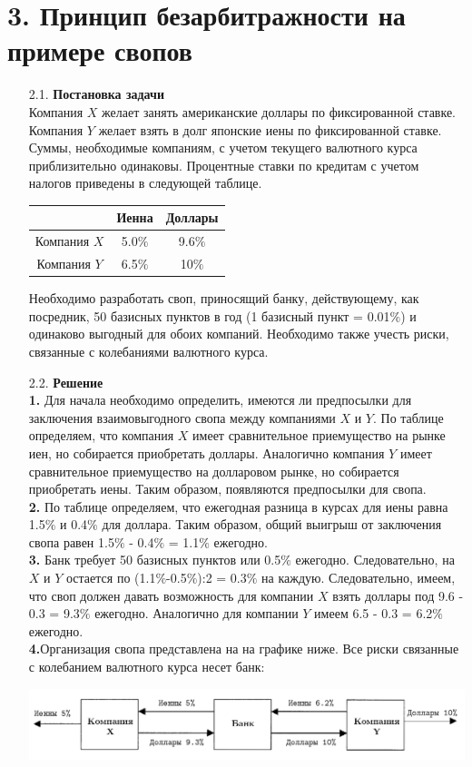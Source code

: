 \documentclass[12pt,a4 paper]{book}
\begin{document}
\section*{3. Принцип безарбитражности на примере свопов}
\smallskip
\begin{enumerate}
\item[2.1.] \textbf{Постановка задачи}
\\Компания $X$ желает занять американские доллары по фиксированной ставке. Компания $Y$ желает взять в долг японские иены по фиксированной ставке. Суммы, необходимые компаниям, с учетом текущего валютного курса приблизительно одинаковы. Процентные ставки по кредитам с учетом налогов приведены в следующей таблице.
		\begin{center}
		\begin{tabular}{|c||cc|}
			\hline
			& Иенна & Доллары\\
			\hline
			\hline
			Компания $X$ & 5.0$\%$  & 9.6$\%$  \\
			Компания $Y$ & 6.5$\%$  & 10$\%$  \\
			\hline
		\end{tabular}
		\end{center}
		Необходимо разработать своп, приносящий банку, действующему, как посредник, 50 базисных пунктов в год (1 базисный пункт = 0.01$\%$) и одинаково выгодный для обоих компаний. Необходимо также учесть риски, связанные с колебаниями валютного курса.
\item[2.2.] \textbf{Решение}
\smallskip
\\\textbf{1.} Для начала необходимо определить, имеются ли предпосылки для заключения взаимовыгодного свопа между компаниями $X$ и $Y$. По таблице определяем, что компания $X$ имеет сравнительное приемущество на рынке иен, но собирается приобретать доллары. Аналогично компания $Y$ имеет сравнительное приемущество на долларовом рынке, но собирается приобретать иены. Таким образом, появляются предпосылки для свопа.\\
		\textbf{2.} По таблице определяем, что ежегодная разница в курсах для иены равна 1.5$\%$ и 0.4$\%$ для доллара. Таким образом, общий выигрыш от заключения свопа равен 1.5$\%$ - 0.4$\%$ = 1.1$\%$ ежегодно.\\
		\textbf{3.} Банк требует 50 базисных пунктов или 0.5$\%$ ежегодно. Следовательно, на $X$ и $Y$ остается по (1.1$\%$-0.5$\%$):2 = 0.3$\%$ на каждую. Следовательно, имеем, что своп должен давать возможность для компании $X$ взять доллары под 9.6 - 0.3 = 9.3$\%$ ежегодно. Аналогично для компании $Y$ имеем 6.5 - 0.3 = 6.2$\%$ ежегодно.\\
		\textbf{4.}Организация свопа представлена на на графике ниже. Все риски связанные с колебанием валютного курса несет банк:
		\begin{center}
		    \includegraphics[width=16.7cm]{фото_курсач.png}
		\end{center}
\end{enumerate}
\end{document}

